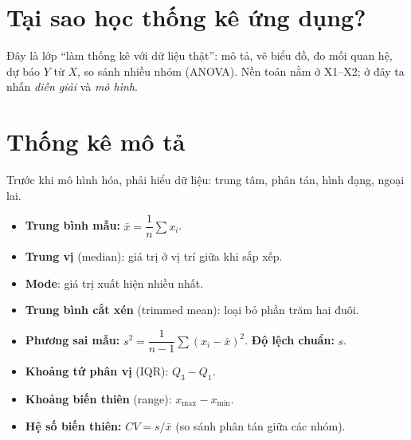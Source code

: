 \documentclass[12pt,a4paper]{article}
\begin{document}

\newpage
\tableofcontents
\newpage



\section{Tại sao học thống kê ứng dụng?}

\begin{dongco}[title={Động cơ --- Tại sao học thống kê ứng dụng?}]
Đây là lớp ``làm thống kê với dữ liệu thật'': mô tả, vẽ biểu đồ, đo mối quan hệ, dự báo $Y$ từ $X$, so sánh nhiều nhóm (ANOVA). Nền toán nằm ở X1--X2; ở đây ta nhấn \emph{diễn giải} và \emph{mô hình}.
\end{dongco}

\newpage

\section{Thống kê mô tả}

\begin{dongco}[title={Động cơ --- Thống kê mô tả}]
Trước khi mô hình hóa, phải hiểu dữ liệu: trung tâm, phân tán, hình dạng, ngoại lai.
\end{dongco}

\begin{dinhnghia}[title={Các đại lượng đo xu hướng trung tâm}]
  \begin{itemize}
    \item \textbf{Trung bình mẫu:} $\bar{x} = \dfrac{1}{n}\sum x_i$.
    \item \textbf{Trung vị} (median): giá trị ở vị trí giữa khi sắp xếp.
    \item \textbf{Mode}: giá trị xuất hiện nhiều nhất.
    \item \textbf{Trung bình cắt xén} (trimmed mean): loại bỏ phần trăm hai đuôi.
  \end{itemize}
\end{dinhnghia}

\begin{dinhnghia}[title={Các đại lượng đo độ phân tán}]
  \begin{itemize}
    \item \textbf{Phương sai mẫu:} $s^2 = \dfrac{1}{n-1}\sum(x_i - \bar{x})^2$. \textbf{Độ lệch chuẩn:} $s$.
    \item \textbf{Khoảng tứ phân vị} (IQR): $Q_3 - Q_1$.
    \item \textbf{Khoảng biến thiên} (range): $x_{\max} - x_{\min}$.
    \item \textbf{Hệ số biến thiên:} $CV = s/\bar{x}$ (so sánh phân tán giữa các nhóm).
  \end{itemize}
\end{dinhnghia}
\end{document}
